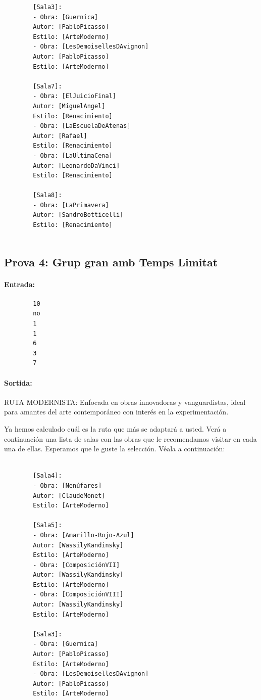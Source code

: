 \documentclass[a4paper]{article}
\begin{document}
\begin{verbatim}
		[Sala3]:
		- Obra: [Guernica]
		Autor: [PabloPicasso]
		Estilo: [ArteModerno]
		- Obra: [LesDemoisellesDAvignon]
		Autor: [PabloPicasso]
		Estilo: [ArteModerno]
		
		[Sala7]:
		- Obra: [ElJuicioFinal]
		Autor: [MiguelAngel]
		Estilo: [Renacimiento]
		- Obra: [LaEscuelaDeAtenas]
		Autor: [Rafael]
		Estilo: [Renacimiento]
		- Obra: [LaUltimaCena]
		Autor: [LeonardoDaVinci]
		Estilo: [Renacimiento]
		
		[Sala8]:
		- Obra: [LaPrimavera]
		Autor: [SandroBotticelli]
		Estilo: [Renacimiento]
		
	\end{verbatim}
	
	\subsection{Prova 4: Grup gran amb Temps Limitat}
	\paragraph{Entrada:}
	\begin{verbatim}
		10
		no
		1
		1
		6
		3
		7
	\end{verbatim}

	\paragraph{Sortida:\\}
		
		RUTA MODERNISTA: Enfocada en obras innovadoras y vanguardistas, ideal para amantes del arte contemporáneo con interés en la experimentación.
		
		Ya hemos calculado cuál es la ruta que más se adaptará a usted. Verá a continuación una lista de salas con las obras que le recomendamos visitar en cada una de ellas. Esperamos que le guste la selección. Véala a continuación:
		
		\begin{verbatim}
		
		[Sala4]:
		- Obra: [Nenúfares]
		Autor: [ClaudeMonet]
		Estilo: [ArteModerno]
		
		[Sala5]:
		- Obra: [Amarillo-Rojo-Azul]
		Autor: [WassilyKandinsky]
		Estilo: [ArteModerno]
		- Obra: [ComposiciónVII]
		Autor: [WassilyKandinsky]
		Estilo: [ArteModerno]
		- Obra: [ComposiciónVIII]
		Autor: [WassilyKandinsky]
		Estilo: [ArteModerno]
		
		[Sala3]:
		- Obra: [Guernica]
		Autor: [PabloPicasso]
		Estilo: [ArteModerno]
		- Obra: [LesDemoisellesDAvignon]
		Autor: [PabloPicasso]
		Estilo: [ArteModerno]
	\end{verbatim}
	
\end{document}
